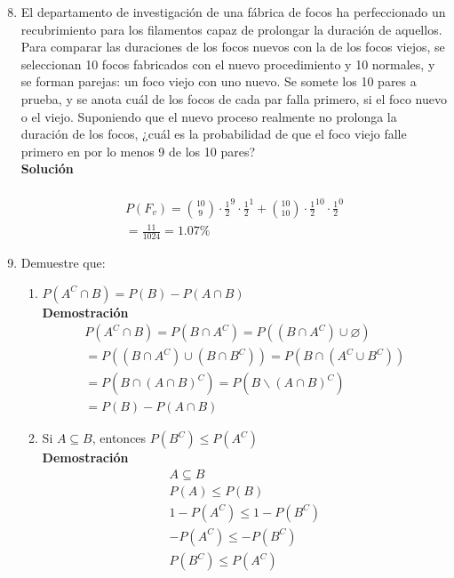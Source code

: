 
\begin{enumerate}
	\setcounter{enumi}{7} %
	\item El departamento de investigación de una fábrica de focos ha perfeccionado un recubrimiento para los filamentos capaz de prolongar la duración de aquellos. Para comparar las duraciones de los focos nuevos con la de los focos viejos, se seleccionan 10 focos fabricados con el nuevo procedimiento y 10 normales, y se forman parejas: un foco viejo con uno nuevo. Se somete los 10 pares a prueba, y se anota cuál de los focos de cada par falla primero, si el foco nuevo o el viejo. Suponiendo que el nuevo proceso realmente no prolonga la duración de los focos, ¿cuál es la probabilidad de que el foco viejo falle primero en por lo menos 9 de los 10 pares?
	\\\textbf{Solución}
	\\ \\
	\begin{gather*}
        P(F_v) = \binom{10}{9} \cdot \frac{1}{2}^9 \cdot \frac{1}{2}^1 + \binom{10}{10} \cdot \frac{1}{2}^{10} \cdot \frac{1}{2}^0 \\
        = \frac{11}{1024} = 1.07\%
	\end{gather*}
	
	\item Demuestre que:
    \begin{enumerate}
        \item $P(A^C \cap B) = P(B) - P(A \cap B)$
    	\\\textbf{Demostración}
        \begin{gather*}
            P(A^C \cap B) = P(B \cap A^C) = P((B \cap A^C) \cup \diameter) \\
            = P((B \cap A^C) \cup (B \cap B^C)) = P(B \cap (A^C \cup B^C)) \\
            = P(B \cap (A \cap B)^C) = P(B \backslash (A \cap B)^C) \\
            = P(B) - P(A \cap B)
    	\end{gather*}

        \item Si $A \subseteq B$, entonces $P(B^C) \leq P(A^C)$
    	\\\textbf{Demostración}
        \begin{gather*}
            A \subseteq B \\
            P(A) \leq P(B) \\
            1 - P(A^C) \leq 1 - P(B^C) \\
            - P(A^C) \leq - P(B^C) \\
            P(B^C) \leq P(A^C)
    	\end{gather*}


\end{enumerate}
\end{enumerate}
